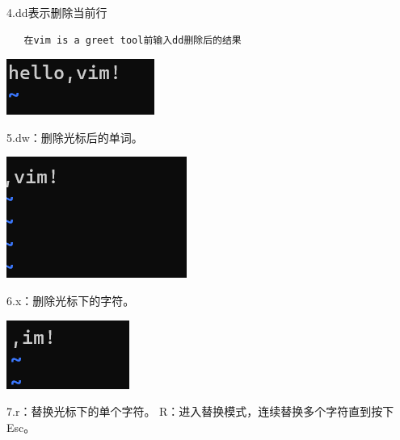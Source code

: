 \documentclass{article}
\begin{document}
4.dd表示删除当前行
\begin{verbatim}
   在vim is a greet tool前输入dd删除后的结果
\end{verbatim}


\noindent
\begin{minipage}{\linewidth}
 \centering
  \includegraphics[width=0.5\linewidth]{vim4.png}
  \label{fig:example}
\end{minipage}

5.dw：删除光标后的单词。

\noindent
\begin{minipage}{\linewidth}
 \centering
  \includegraphics[width=0.5\linewidth]{vim5.png}
  \label{fig:example}
\end{minipage}

6.x：删除光标下的字符。

\noindent
\begin{minipage}{\linewidth}
 \centering
  \includegraphics[width=0.5\linewidth]{vim6.png}
  \label{fig:example}
\end{minipage}

7.r：替换光标下的单个字符。
R：进入替换模式，连续替换多个字符直到按下 Esc。
\end{document}
